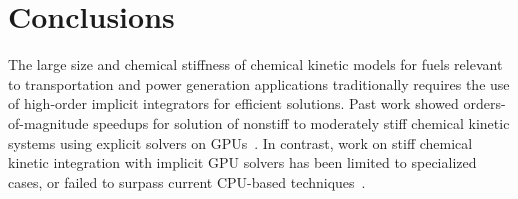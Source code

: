 \documentclass[preprint,review,11pt]{elsarticle}
\begin{document}
\section{Conclusions}
\label{S:conclusions}

The large size and chemical stiffness of chemical kinetic models for fuels relevant to transportation and power generation applications traditionally requires the use of high-order implicit integrators for efficient solutions.
Past work showed orders-of-magnitude speedups for solution of nonstiff to moderately stiff chemical kinetic systems using explicit solvers on GPUs~\cite{Niemeyer:2011aa,Le2013596,Niemeyer:2014aa}.
In contrast, work on stiff chemical kinetic integration with implicit GPU solvers has been limited to specialized cases, or failed to surpass current CPU-based techniques~\cite{Stone:2013aa}.
\end{document}
